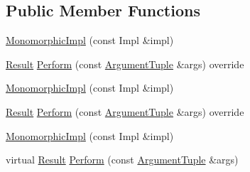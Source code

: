 \subsection*{Public Member Functions}
\begin{DoxyCompactItemize}
\item 
\mbox{\hyperlink{classtesting_1_1_polymorphic_action_1_1_monomorphic_impl_a0f87e4646298d9fd8e7eda04a09fc6d0}{Monomorphic\+Impl}} (const Impl \&impl)
\item 
\mbox{\hyperlink{classtesting_1_1_action_interface_a7477de2fe3e4e01c59db698203acaee7}{Result}} \mbox{\hyperlink{classtesting_1_1_polymorphic_action_1_1_monomorphic_impl_ae532b81e7689e0677d64c81f500f3c15}{Perform}} (const \mbox{\hyperlink{classtesting_1_1_action_interface_af72720d864da4d606629e83edc003511}{Argument\+Tuple}} \&args) override
\item 
\mbox{\hyperlink{classtesting_1_1_polymorphic_action_1_1_monomorphic_impl_a0f87e4646298d9fd8e7eda04a09fc6d0}{Monomorphic\+Impl}} (const Impl \&impl)
\item 
\mbox{\hyperlink{classtesting_1_1_action_interface_a7477de2fe3e4e01c59db698203acaee7}{Result}} \mbox{\hyperlink{classtesting_1_1_polymorphic_action_1_1_monomorphic_impl_ae532b81e7689e0677d64c81f500f3c15}{Perform}} (const \mbox{\hyperlink{classtesting_1_1_action_interface_af72720d864da4d606629e83edc003511}{Argument\+Tuple}} \&args) override
\item 
\mbox{\hyperlink{classtesting_1_1_polymorphic_action_1_1_monomorphic_impl_a0f87e4646298d9fd8e7eda04a09fc6d0}{Monomorphic\+Impl}} (const Impl \&impl)
\item 
virtual \mbox{\hyperlink{classtesting_1_1_action_interface_a7477de2fe3e4e01c59db698203acaee7}{Result}} \mbox{\hyperlink{classtesting_1_1_polymorphic_action_1_1_monomorphic_impl_af657293ae1ac638802c0fd2486ee5f5b}{Perform}} (const \mbox{\hyperlink{classtesting_1_1_action_interface_af72720d864da4d606629e83edc003511}{Argument\+Tuple}} \&args)
\end{DoxyCompactItemize}
